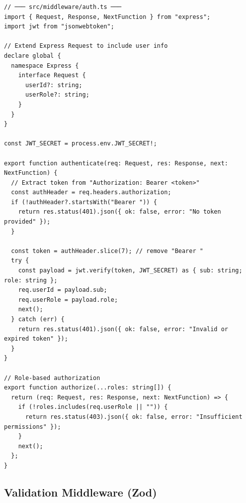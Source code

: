 \documentclass[10pt, a4paper]{article}
\begin{document}
\begin{lstlisting}[language=myjs]
// ─── src/middleware/auth.ts ───
import { Request, Response, NextFunction } from "express";
import jwt from "jsonwebtoken";

// Extend Express Request to include user info
declare global {
  namespace Express {
    interface Request {
      userId?: string;
      userRole?: string;
    }
  }
}

const JWT_SECRET = process.env.JWT_SECRET!;

export function authenticate(req: Request, res: Response, next: NextFunction) {
  // Extract token from "Authorization: Bearer <token>"
  const authHeader = req.headers.authorization;
  if (!authHeader?.startsWith("Bearer ")) {
    return res.status(401).json({ ok: false, error: "No token provided" });
  }

  const token = authHeader.slice(7); // remove "Bearer "
  try {
    const payload = jwt.verify(token, JWT_SECRET) as { sub: string; role: string };
    req.userId = payload.sub;
    req.userRole = payload.role;
    next();
  } catch (err) {
    return res.status(401).json({ ok: false, error: "Invalid or expired token" });
  }
}

// Role-based authorization
export function authorize(...roles: string[]) {
  return (req: Request, res: Response, next: NextFunction) => {
    if (!roles.includes(req.userRole || "")) {
      return res.status(403).json({ ok: false, error: "Insufficient permissions" });
    }
    next();
  };
}
\end{lstlisting}


\subsection{Validation Middleware (Zod)}
\end{document}
